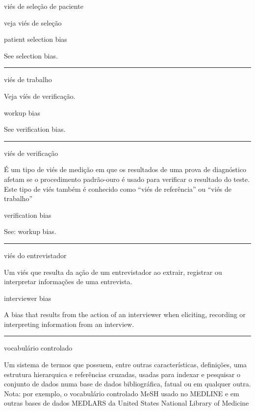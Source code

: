 \documentclass[
]{book}
\begin{document}
viés de seleção de paciente

veja viés de seleção

patient selection bias

See selection bias.

\begin{center}\rule{0.5\linewidth}{0.5pt}\end{center}

viés de trabalho

Veja víés de verificação.

workup bias

See verification bias.

\begin{center}\rule{0.5\linewidth}{0.5pt}\end{center}

viés de verificação

É um tipo de viés de medição em que os resultados de uma prova de diagnóstico afetam se o procedimento padrão-ouro é usado para verificar o resultado do teste. Este tipo de viés também é conhecido como ``viés de referência'' ou ``viés de trabalho''

verification bias

See: workup bias.

\begin{center}\rule{0.5\linewidth}{0.5pt}\end{center}

viés do entrevistador

Um viés que resulta da ação de um entrevistador ao extrair, registrar ou interpretar informações de uma entrevista.

interviewer bias

A bias that results from the action of an interviewer when eliciting, recording or interpreting information from an interview.

\begin{center}\rule{0.5\linewidth}{0.5pt}\end{center}

vocabulário controlado

Um sistema de termos que possuem, entre outras características, definições, uma estrutura hierarquica e referências cruzadas, usadas para indexar e pesquisar o conjunto de dados numa base de dados bibliográfica, fatual ou em qualquer outra. Nota: por exemplo, o vocabulário controlado MeSH usado no MEDLINE e em outras bases de dados MEDLARS da United States National Library of Medicine
\end{document}
